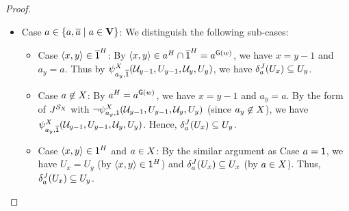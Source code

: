 \begin{proof}
\begin{itemize}
\begin{itemize}
              \item Case $a \in \{a, \overline{a} \mid a \in \mathbf{V}\}$: We distinguish the following sub-cases:
                     \begin{itemize}
                            \item Case $\tuple{x, y} \in \com{\id}^{\graph[2]}$:
                            By $\tuple{x, y} \in a^{\graph[2]} \cap \com{\id}^{\graph[2]} = a^{\const{\graph}(\word)}$, we have $x = y - 1$ and $a_{y} = a$.
                            Thus by $\fml[2]_{a_{y}, \com{\id}}^{\Aset}(\mathcal{U}_{y - 1}, U_{y - 1}, \mathcal{U}_{y} , U_{y})$, we have $\delta_{a}^{\graph[3]}(U_{x}) \subseteq U_{y}$.
                            \item Case $a \not\in X$:
                            By $a^{\graph[2]} = a^{\const{\graph}(\word)}$, we have $x = y - 1$ and $a_{y} = a$.
                            By the form of $\graph[3]^{\FillS_{\Aset}}$ with $\lnot \fml[2]_{a_{y}, \id}^{\Aset}(\mathcal{U}_{y - 1}, U_{y - 1}, \mathcal{U}_{y} , U_{y})$ (since $a_{y} \not\in X$),
                            we have $\fml[2]_{a_{y}, \com{\id}}^{\Aset}(\mathcal{U}_{y - 1}, U_{y - 1}, \mathcal{U}_{y} , U_{y})$.
                            Hence, $\delta_{a}^{\graph[3]}(U_{x}) \subseteq U_{y}$.
                            \item Case $\tuple{x, y} \in \id^{\graph[2]}$ and $a \in X$:
                            By the similar argument as Case $a = \mathsf{1}$, we have $U_{x} = U_{y}$ (by $\tuple{x, y} \in \id^{\graph[2]}$) and $\delta_{a}^{\graph[3]}(U_{x}) \subseteq U_{x}$ (by $a \in X$).
                            Thus, $\delta_{a}^{\graph[3]}(U_{x}) \subseteq U_{y}$. \qedhere
                     \end{itemize}
                     \end{itemize}
       \end{itemize}
\end{proof}